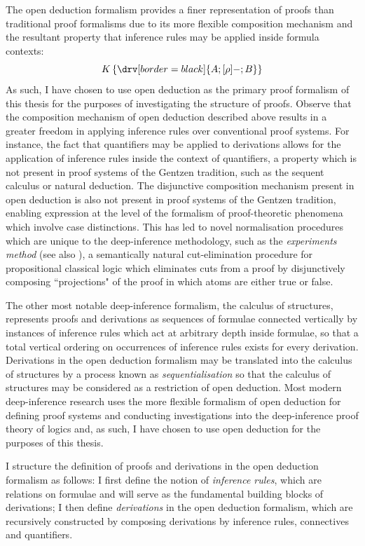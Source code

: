 \documentclass[10pt]{article}
\theoremstyle{definition}\newtheorem{remark}[theorem]{Remark}
\theoremstyle{definition}\newtheorem{example}[theorem]{Example}
\theoremstyle{definition}\newtheorem{definition}[theorem]{Definition}
\begin{document}
	The open deduction formalism provides a finer representation of proofs than traditional proof formalisms due to its more flexible composition mechanism and the resultant property that inference rules may be applied inside formula contexts:
	\[
		K \left\{ \drv[border=black] {
			A ; [\rho]- ; B
		} \right\}
	\]
	As such, I have chosen to use open deduction as the primary proof formalism of this thesis for the purposes of investigating the structure of proofs. Observe that the composition mechanism of open deduction described above results in a greater freedom in applying inference rules over conventional proof systems. For instance, the fact that quantifiers may be applied to derivations allows for the application of inference rules inside the context of quantifiers, a property which is not present in proof systems of the Gentzen tradition, such as the sequent calculus or natural deduction. The disjunctive composition mechanism present in open deduction is also not present in proof systems of the Gentzen tradition, enabling expression at the level of the formalism of proof-theoretic phenomena which involve case distinctions. This has led to novel normalisation procedures which are unique to the deep-inference methodology, such as the \textit{experiments method} \cite{BenThesis} (see also \cite{ChrisAlessioDecisionTrees}), a semantically natural cut-elimination procedure for propositional classical logic which eliminates cuts from a proof by disjunctively composing ``projections" of the proof in which atoms are either true or false.
	
	The other most notable deep-inference formalism, the calculus of structures, represents proofs and derivations as sequences of formulae connected vertically by instances of inference rules which act at arbitrary depth inside formulae, so that a total vertical ordering on occurrences of inference rules exists for every derivation. Derivations in the open deduction formalism may be translated into the calculus of structures by a process known as \textit{sequentialisation} \cite{BenThesis, RalphExpansionProofs} so that the calculus of structures may be considered as a restriction of open deduction. Most modern deep-inference research uses the more flexible formalism of open deduction for defining proof systems and conducting investigations into the deep-inference proof theory of logics and, as such, I have chosen to use open deduction for the purposes of this thesis.
	
	I structure the definition of proofs and derivations in the open deduction formalism as follows: I first define the notion of \textit{inference rules}, which are relations on formulae and will serve as the fundamental building blocks of derivations; I then define \textit{derivations} in the open deduction formalism, which are recursively constructed by composing derivations by inference rules, connectives and quantifiers.
	
\end{document}

